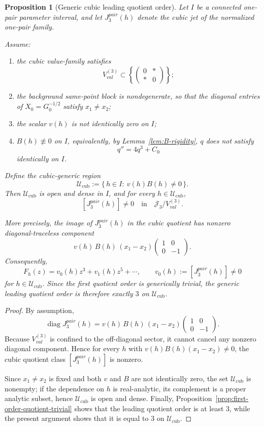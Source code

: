 \documentclass[11pt,a4paper]{amsart}
\def\val{val}%
\def\pair{pair}%
\theoremstyle{plain}
\newtheorem{proposition}[theorem]{Proposition}
\theoremstyle{definition}
\newcommand{\val}{\mathrm{val}}
\newcommand{\pair}{\mathrm{pair}}
\begin{document}
\begin{proposition}[Generic cubic leading quotient order]
\label{prop:cubic-leading-order}
Let $I$ be a connected one-pair parameter interval, and let
$J_3^{\pair}(h)$ denote the cubic jet of the normalized one-pair family.

Assume:
\begin{enumerate}
\item the cubic value-family satisfies
\[
V_{\val}^{(3)}
\subset
\left\{
\begin{pmatrix}
0&*\\ *&0
\end{pmatrix}
\right\};
\]
\item the background same-point block is nondegenerate, so that the diagonal
entries of $X_0=G_0^{-1/2}$ satisfy $x_1\neq x_2$;
\item the scalar $v(h)$ is not identically zero on $I$;
\item $B(h)\not\equiv 0$ on $I$, equivalently, by
Lemma~\ref{lem:B-rigidity}, $q$ does not satisfy
\[
q''=4q^3+C_0
\]
identically on $I$.
\end{enumerate}

Define the cubic-generic region
\[
\mathcal U_{\mathrm{cub}}
:=
\{\,h\in I:\ v(h)B(h)\neq 0\,\}.
\]
Then $\mathcal U_{\mathrm{cub}}$ is open and dense in $I$, and for every
$h\in \mathcal U_{\mathrm{cub}}$,
\[
[J_3^{\pair}(h)]\neq 0
\quad\text{in}\quad
\mathcal J_3/V_{\val}^{(3)}.
\]

More precisely, the image of $J_3^{\pair}(h)$ in the cubic quotient has
nonzero diagonal-traceless component
\[
v(h)\,B(h)\,(x_1-x_2)
\begin{pmatrix}
1&0\\0&-1
\end{pmatrix}.
\]
Consequently,
\[
F_h(z)=v_0(h)z^3+v_1(h)z^5+\cdots,
\qquad
v_0(h):=[J_3^{\pair}(h)]\neq 0
\]
for $h\in \mathcal U_{\mathrm{cub}}$. Since the first quotient order is
generically trivial, the generic leading quotient order is therefore exactly
$3$ on $\mathcal U_{\mathrm{cub}}$.
\end{proposition}

\begin{proof}
By assumption,
\[
\operatorname{diag}J_3^{\pair}(h)
=
v(h)\,B(h)\,(x_1-x_2)
\begin{pmatrix}
1&0\\0&-1
\end{pmatrix}.
\]
Because $V_{\val}^{(3)}$ is confined to the off-diagonal sector, it cannot
cancel any nonzero diagonal component. Hence for every $h$ with
$v(h)B(h)(x_1-x_2)\neq 0$, the cubic quotient class
$[J_3^{\pair}(h)]$ is nonzero.

Since $x_1\neq x_2$ is fixed and both $v$ and $B$ are not identically
zero, the set $\mathcal U_{\mathrm{cub}}$ is nonempty; if the dependence on
$h$ is real-analytic, its complement is a proper analytic subset, hence
$\mathcal U_{\mathrm{cub}}$ is open and dense. Finally,
Proposition~\ref{prop:first-order-quotient-trivial} shows that the leading
quotient order is at least $3$, while the present argument shows that it is
equal to $3$ on $\mathcal U_{\mathrm{cub}}$.
\end{proof}
\end{document}
